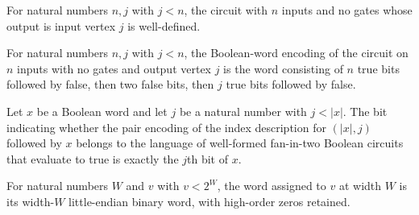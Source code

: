 \begin{definition}
\label{Complexity.Meyer.idxCircuit}
\leanok
{}
For natural numbers $n,j$ with $j<n$, the circuit with $n$ inputs and no gates whose
output is input vertex $j$ is well-defined.
\end{definition}

\begin{theorem}
\label{Complexity.Meyer.idxCircuit_encode}
\leanok
{}
For natural numbers $n,j$ with $j<n$, the Boolean-word encoding of the circuit on $n$
inputs with no gates and output vertex $j$ is the word consisting of $n$ true bits
followed by false, then two false bits, then $j$ true bits followed by false.
\end{theorem}

\begin{theorem}
\label{Complexity.Meyer.xbOf_eq}
\leanok
{}
Let $x$ be a Boolean word and let $j$ be a natural number with $j<|x|$. The bit
indicating whether the pair encoding of the index description for $(|x|,j)$ followed by
$x$ belongs to the language of well-formed fan-in-two Boolean circuits that evaluate to
true is exactly the $j$th bit of $x$.
\end{theorem}

\begin{theorem}
\label{Complexity.Meyer.wordOf_of_lt}
\leanok
{}
For natural numbers $W$ and $v$ with $v<2^W$, the word assigned to $v$ at width $W$ is
its width-$W$ little-endian binary word, with high-order zeros retained.
\end{theorem}

